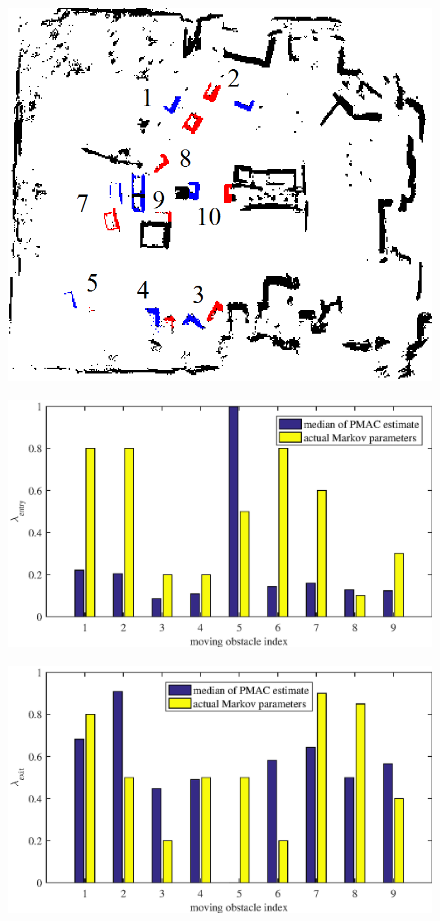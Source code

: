 \begin{figure}
\centering
\includegraphics[scale=1.3]{chapters/evaluation/figures/cells_used_for_evaluation_with_identification}
\caption{}
\label{fig:cells_used_for_evaluation_with_identification}
\end{figure}
\begin{figure}
\centering
\includegraphics[scale=1]{chapters/evaluation/figures/compare_learned_markov_entry}
\caption{}
\label{fig:compare_learned_markov_entry}
\end{figure}
\begin{figure}
\centering
\includegraphics[scale=1]{chapters/evaluation/figures/compare_learned_markov_exit}
\caption{}
\label{fig:compare_learned_markov_exit}
\end{figure}


